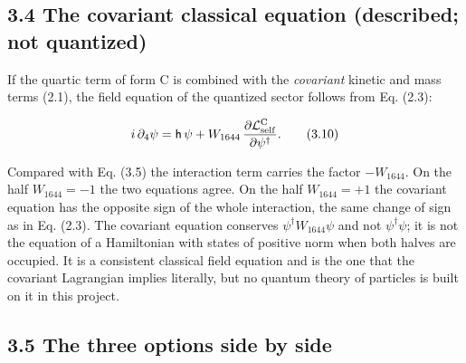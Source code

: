 \documentclass[
  10pt,
]{article}
\begin{document}
\hypertarget{the-covariant-classical-equation-described-not-quantized}{%
\subsection{3.4 The covariant classical equation (described; not
quantized)}\label{the-covariant-classical-equation-described-not-quantized}}

If the quartic term of form C is combined with the \emph{covariant}
kinetic and mass terms (2.1), the field equation of the quantized sector
follows from Eq. (2.3):

\[i\,\partial_4\psi=\mathsf h\,\psi+W_{1644}\,\frac{\partial\mathcal L_{\rm self}^{\rm C}}{\partial\psi^\dagger}.\tag{3.10}\]

Compared with Eq. (3.5) the interaction term carries the factor
\(-W_{1644}\). On the half \(W_{1644}=-1\) the two equations agree. On
the half \(W_{1644}=+1\) the covariant equation has the opposite sign of
the whole interaction, the same change of sign as in Eq. (2.3). The
covariant equation conserves \(\psi^\dagger W_{1644}\psi\) and not
\(\psi^\dagger\psi\); it is not the equation of a Hamiltonian with
states of positive norm when both halves are occupied. It is a
consistent classical field equation and is the one that the covariant
Lagrangian implies literally, but no quantum theory of particles is
built on it in this project.

\hypertarget{the-three-options-side-by-side}{%
\subsection{3.5 The three options side by
side}\label{the-three-options-side-by-side}}
\end{document}
